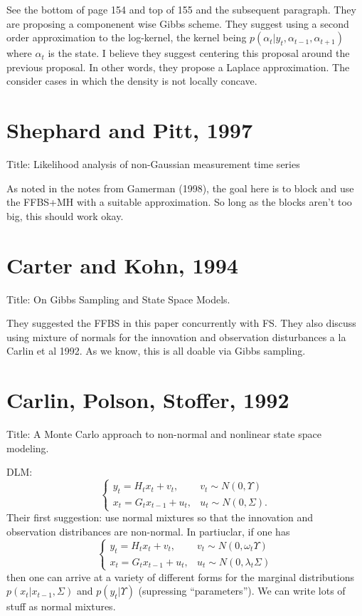 \documentclass{article}
\begin{document}
See the bottom of page 154 and top of 155 and the subsequent paragraph.  They
are proposing a componenent wise Gibbs scheme.  They suggest using a second
order approximation to the log-kernel, the kernel being $p(\alpha_t | y_t,
\alpha_{t-1}, \alpha_{t+1})$ where $\alpha_t$ is the state.  I believe they
suggest centering this proposal around the previous proposal.  In other words,
they propose a Laplace approximation.  The consider cases in which the density
is not locally concave.

\section{Shephard and Pitt, 1997}

Title: Likelihood analysis of non-Gaussian measurement time series

As noted in the notes from Gamerman (1998), the goal here is to block and use
the FFBS+MH with a suitable approximation.  So long as the blocks aren't too
big, this should work okay.

\section{Carter and Kohn, 1994}

Title: On Gibbs Sampling and State Space Models.

They suggested the FFBS in this paper concurrently with FS.  They also discuss
using mixture of normals for the innovation and observation disturbances a la
Carlin et al 1992.  As we know, this is all doable via Gibbs sampling.

\section{Carlin, Polson, Stoffer, 1992}

Title: A Monte Carlo approach to non-normal and nonlinear state space modeling.

DLM:
\[
\begin{cases}
y_t = H_t x_t + v_t, & v_t \sim N(0, \Upsilon) \\
x_t = G_t x_{t-1} + u_t, & u_t \sim N(0, \Sigma).
\end{cases}
\]
Their first suggestion: use normal mixtures so that the innovation and
observation distribances are non-normal.  In partiuclar, if one has
\[
\begin{cases}
y_t = H_t x_t + v_t, & v_t \sim N(0, \omega_t \Upsilon) \\
x_t = G_t x_{t-1} + u_t, & u_t \sim N(0, \lambda_t \Sigma)
\end{cases}
\]
then one can arrive at a variety of different forms for the marginal
distributions $p(x_t | x_{t-1}, \Sigma)$ and $p(y_t | \Upsilon)$ (supressing
``parameters'').  We can write lots of stuff as normal mixtures.
\end{document}
